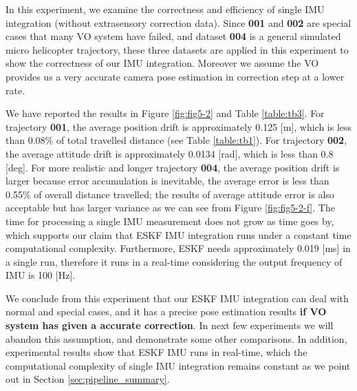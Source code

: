 In this experiment, we examine the correctness and efficiency of single IMU integration (without extrasensory correction data). Since \textbf{001} and \textbf{002} are special cases that many VO system \cite{davison2003real, engel2014lsd} have failed, and dataset \textbf{004} is a general simulated micro helicopter trajectory, these three datasets are applied in this experiment to show the correctness of our IMU integration. Moreover we assume the VO provides us a very accurate camera pose estimation in correction step at a lower rate.  

We have reported the results in Figure \ref{fig:fig5-2} and Table \ref{table:tb3}. For trajectory \textbf{001}, the average position drift is approximately 0.125 [m], which is less than 0.08\% of total travelled distance (see Table \ref{table:tb1}). For trajectory \textbf{002}, the average attitude drift is approximately 0.0134 [rad], which is less than 0.8 [deg]. For more realistic and longer trajectory \textbf{004}, the average position drift is larger because error accumulation is inevitable, the average error is less than 0.55\% of overall distance travelled; the results of average attitude error is also acceptable but has larger variance as we can see from Figure \ref{fig:fig5-2-f}. The time for processing a single IMU measurement does not grow as time goes by, which supports our claim that ESKF IMU integration runs under a constant time computational complexity. Furthermore, ESKF needs approximately 0.019 [ms] in a single run, therefore it runs in a real-time considering the output frequency of IMU is 100 [Hz].

We conclude from this experiment that our ESKF IMU integration can deal with normal and special cases, and it has a precise pose estimation results \textbf{if VO system has given a accurate correction}. In next few experiments we will abandon this assumption, and demonstrate some other comparisons. In addition, experimental results show that ESKF IMU runs in real-time, which the computational complexity of single IMU integration remains constant as we point out in Section \ref{sec:pipeline_summary}. 

